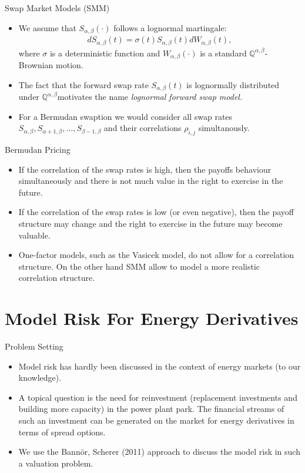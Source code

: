 {Swap Market Models (SMM)}
\begin{itemize}
\item<1->
We assume that $S_{\alpha,\beta}(\cdot)$ follows a
lognormal martingale:
\begin{eqnarray*}
dS_{\alpha,\beta}(t) = \sigma (t) S_{\alpha,\beta}(t)
dW_{\alpha,\beta}(t),
\end{eqnarray*}
where $\sigma$ is a deterministic function and
$W_{\alpha,\beta}(\cdot)$ is a standard $\mathbb
Q^{\alpha,\beta}$-Brownian motion.
\item<2-> The fact that the forward swap
rate $S_{\alpha,\beta}(t)$ is lognormally distributed under
$\mathbb Q^{\alpha,\beta}$motivates the name {\em lognormal
forward swap model.}
\item<3-> For a Bermudan swaption we would consider all swap rates
$S_{\alpha,\beta}, S_{\alpha+1,\beta}, \ldots, S_{\beta-1,\beta}$ and their correlations $\rho_{i,j}$ simultanously.
\end{itemize}



{Bermudan Pricing}
\begin{itemize}
\item<1->
If the correlation of the swap rates is high, then the payoffs behaviour simultaneously and there is not much value in the right to exercise in the future.
\item<2-> If the correlation of the swap rates is low (or even negative), then the payoff structure may change  and the right to exercise in the future may become valuable.
\item<3-> One-factor models, such as the Vasicek model, do not allow for a correlation structure. On the other hand SMM allow to model a more realistic correlation structure. \end{itemize}





\section{Model Risk For Energy Derivatives}

{Problem Setting}
\begin{itemize}
\item<1-> Model risk has hardly been discussed in the context of energy markets (to our knowledge).
\item<2-> A topical question is the need for reinvestment (replacement investments and building more capacity) in the power plant park. The financial streams of such an investment can be generated on the market for energy derivatives in terms of spread options.
\item<3-> We use the Bann{\"o}r, Scherer (2011) approach to discuss the model risk in such a valuation problem.
\end{itemize}






